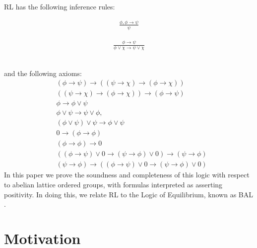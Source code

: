 \documentclass[preprint,leqno]{elsarticle}
\begin{document}
%
RL has the following inference rules:\\
\begin{minipage}{0.49\textwidth}
\begin{gather}
  \tag{MP} \frac{\phi, \phi \rightarrow \psi}{\psi}
\end{gather}
\end{minipage}
\begin{minipage}{0.49\textwidth}
\begin{gather}
  \tag{RI} \frac{\phi \rightarrow \psi}{\phi \lor \chi \rightarrow \psi \lor \chi}
\end{gather}
\end{minipage}
\vspace{0.3cm}\\
and the following axioms:
\begin{align}
  \tag{R1a} &(\phi \rightarrow \psi) \rightarrow ((\psi \rightarrow \chi)
  \rightarrow (\phi \rightarrow \chi))\\
  \tag{R1b} &((\psi \rightarrow \chi) \rightarrow (\phi \rightarrow
  \chi)) \rightarrow (\phi \rightarrow \psi)\\
  \tag{R2} &\phi \rightarrow \phi \lor \psi\\
  \tag{R3} &\phi \lor \psi \rightarrow \psi \lor \phi,\\
  \tag{R4} &(\phi \lor \psi)\lor \psi \rightarrow \phi \lor \psi\\
  \tag{R5a} &0 \rightarrow (\phi \rightarrow \phi)\\
  \tag{R5b} &(\phi \rightarrow\phi) \rightarrow 0\\
  \tag{R6a} &((\phi \rightarrow \psi)\lor 0 \rightarrow (\psi \rightarrow \phi) \lor 0) \rightarrow (\psi \rightarrow \phi)\\
  \tag{R6b} & (\psi \rightarrow \phi) \rightarrow ((\phi \rightarrow \psi)\lor 0 \rightarrow (\psi \rightarrow \phi) \lor 0)
\end{align}
In this paper we prove the soundness and completeness of this logic
with respect to abelian lattice ordered groups, with formulas
interpreted as asserting positivity. In doing this, we relate RL to
the Logic of Equilibrium, known as BAL \cite{Galli:04}.


\section{Motivation}
\end{document}
